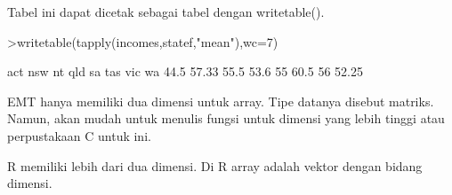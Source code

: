 \documentclass[a4paper,10pt]{article}
\begin{document}
\begin{eulernotebook}
\begin{eulercomment}
\begin{eulercomment}
\begin{eulercomment}
\begin{eulercomment}
\begin{eulercomment}
\begin{eulercomment}
\begin{eulercomment}
Tabel ini dapat dicetak sebagai tabel dengan writetable().
\end{eulercomment}
\begin{eulerprompt}
>writetable(tapply(incomes,statef,"mean"),wc=7)
\end{eulerprompt}
\begin{euleroutput}
      act    nsw     nt    qld     sa    tas    vic     wa
     44.5  57.33   55.5   53.6     55   60.5     56  52.25
\end{euleroutput}
\begin{eulercomment}
EMT hanya memiliki dua dimensi untuk array. Tipe datanya disebut
matriks. Namun, akan mudah untuk menulis fungsi untuk dimensi yang
lebih tinggi atau perpustakaan C untuk ini.

R memiliki lebih dari dua dimensi. Di R array adalah vektor dengan
bidang dimensi.


\end{eulercomment}
\end{eulercomment}
\end{eulercomment}
\end{eulercomment}
\end{eulercomment}
\end{eulercomment}
\end{eulercomment}
\end{eulernotebook}
\end{document}
